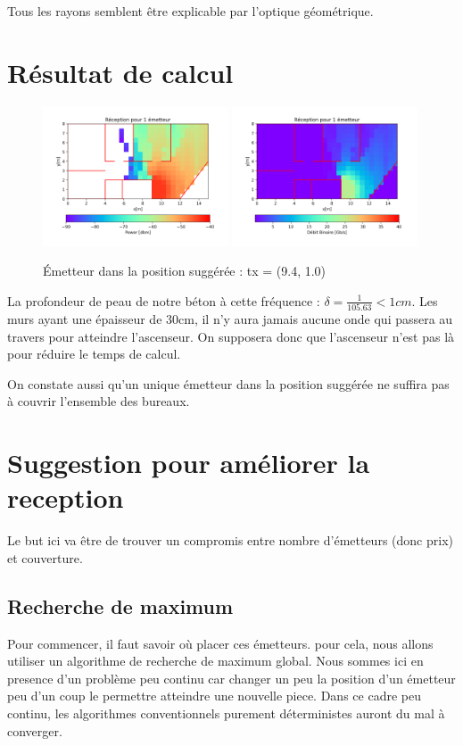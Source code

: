 \documentclass[sn-mathphys-num]{sn-jnl}%
\theoremstyle{thmstyleone}%
\theoremstyle{thmstyletwo}%
\theoremstyle{thmstylethree}%
\begin{document}
Tous les rayons semblent être explicable par l'optique géométrique.
    

\section{Résultat de calcul}

\begin{figure}[H]
    \centering
    \includegraphics[width=0.49\textwidth]{images/base.png}
    \includegraphics[width=0.49\textwidth]{images/base_binaire.png}
    \caption{Émetteur dans la position suggérée : tx = (9.4, 1.0)}
\end{figure}

La profondeur de peau de notre béton à cette fréquence : $\delta = \frac{1}{105.63} < 1cm$.
Les murs ayant une épaisseur de 30cm, il n'y aura jamais aucune onde qui passera au travers
pour atteindre l'ascenseur.
On supposera donc que l'ascenseur n'est pas là pour réduire le temps de calcul. 

On constate aussi qu'un unique émetteur dans la position suggérée ne suffira pas à couvrir l'ensemble des bureaux.

\section{Suggestion pour améliorer la reception}

Le but ici va être de trouver un compromis entre nombre d'émetteurs (donc prix) et couverture.

\subsection{Recherche de maximum}
Pour commencer, il faut savoir où placer ces émetteurs. pour cela,
nous allons utiliser un algorithme de recherche de maximum global.
Nous sommes ici en presence d'un problème peu continu car changer un peu 
la position d'un émetteur
peu d'un coup le permettre atteindre une nouvelle piece.
Dans ce cadre peu continu, les algorithmes conventionnels purement déterministes
auront du mal à converger.
\end{document}
